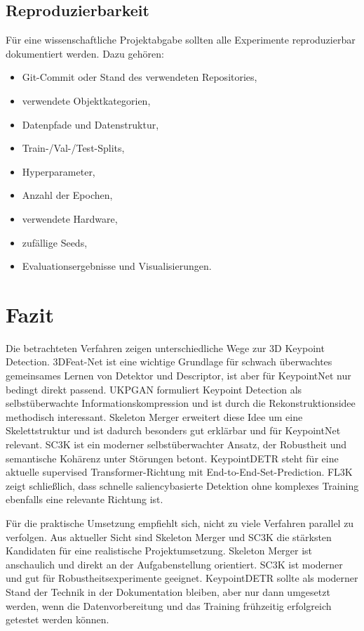 \documentclass[11pt,a4paper]{article}
\begin{document}
\subsection{Reproduzierbarkeit}

Für eine wissenschaftliche Projektabgabe sollten alle Experimente reproduzierbar dokumentiert werden. Dazu gehören:

\begin{itemize}
    \item Git-Commit oder Stand des verwendeten Repositories,
    \item verwendete Objektkategorien,
    \item Datenpfade und Datenstruktur,
    \item Train-/Val-/Test-Splits,
    \item Hyperparameter,
    \item Anzahl der Epochen,
    \item verwendete Hardware,
    \item zufällige Seeds,
    \item Evaluationsergebnisse und Visualisierungen.
\end{itemize}

\section{Fazit}

Die betrachteten Verfahren zeigen unterschiedliche Wege zur 3D Keypoint Detection. 3DFeat-Net ist eine wichtige Grundlage für schwach überwachtes gemeinsames Lernen von Detektor und Descriptor, ist aber für KeypointNet nur bedingt direkt passend. UKPGAN formuliert Keypoint Detection als selbstüberwachte Informationskompression und ist durch die Rekonstruktionsidee methodisch interessant. Skeleton Merger erweitert diese Idee um eine Skelettstruktur und ist dadurch besonders gut erklärbar und für KeypointNet relevant. SC3K ist ein moderner selbstüberwachter Ansatz, der Robustheit und semantische Kohärenz unter Störungen betont. KeypointDETR steht für eine aktuelle supervised Transformer-Richtung mit End-to-End-Set-Prediction. FL3K zeigt schließlich, dass schnelle saliencybasierte Detektion ohne komplexes Training ebenfalls eine relevante Richtung ist.

Für die praktische Umsetzung empfiehlt sich, nicht zu viele Verfahren parallel zu verfolgen. Aus aktueller Sicht sind Skeleton Merger und SC3K die stärksten Kandidaten für eine realistische Projektumsetzung. Skeleton Merger ist anschaulich und direkt an der Aufgabenstellung orientiert. SC3K ist moderner und gut für Robustheitsexperimente geeignet. KeypointDETR sollte als moderner Stand der Technik in der Dokumentation bleiben, aber nur dann umgesetzt werden, wenn die Datenvorbereitung und das Training frühzeitig erfolgreich getestet werden können.
\end{document}
